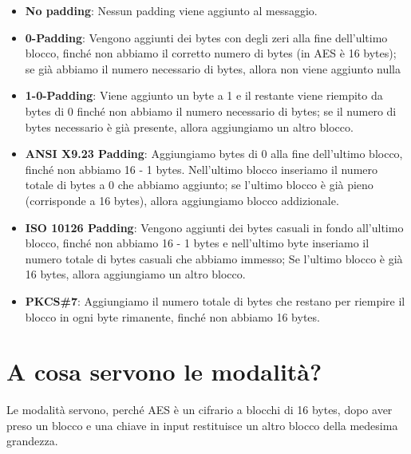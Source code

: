 \begin{itemize}
	\item \textsf{\small \textbf{No padding}: Nessun padding viene aggiunto al messaggio.}
	\item \textsf{\small \textbf{0-Padding}: Vengono aggiunti dei bytes con degli zeri alla fine dell'ultimo blocco, finché non abbiamo il corretto numero di bytes (in AES è 16 bytes); se già abbiamo il numero necessario di bytes, allora non viene aggiunto nulla}
	\item \textsf{\small \textbf{1-0-Padding}: Viene aggiunto un byte a 1 e il restante viene riempito da bytes di 0 finché non abbiamo il numero necessario di bytes; se il numero di bytes necessario è già presente, allora aggiungiamo un altro blocco.}
	\item \textsf{\small \textbf{ANSI X9.23 Padding}: Aggiungiamo bytes di 0 alla fine dell'ultimo blocco, finché non abbiamo 16 - 1 bytes. Nell'ultimo blocco inseriamo il numero totale di bytes a 0 che abbiamo aggiunto; se l'ultimo blocco è già pieno (corrisponde a 16 bytes), allora aggiungiamo blocco addizionale.}
	\item \textsf{\small \textbf{ISO 10126 Padding}: Vengono aggiunti dei bytes casuali in fondo all'ultimo blocco, finché non abbiamo 16 - 1 bytes e nell'ultimo byte inseriamo il numero totale di bytes casuali che abbiamo immesso; Se l'ultimo blocco è già 16 bytes, allora aggiungiamo un altro blocco.}
	\item \textsf{\small \textbf{PKCS\#7}: Aggiungiamo il numero totale di bytes che restano per riempire il blocco in ogni byte rimanente, finché non abbiamo 16 bytes.}
\end{itemize}


\section{A cosa servono le modalità?} %

\textsf{\small Le modalità servono, perché AES è un cifrario a blocchi di 16 bytes, dopo aver preso un blocco e una chiave in input restituisce un altro blocco della medesima grandezza.} %

